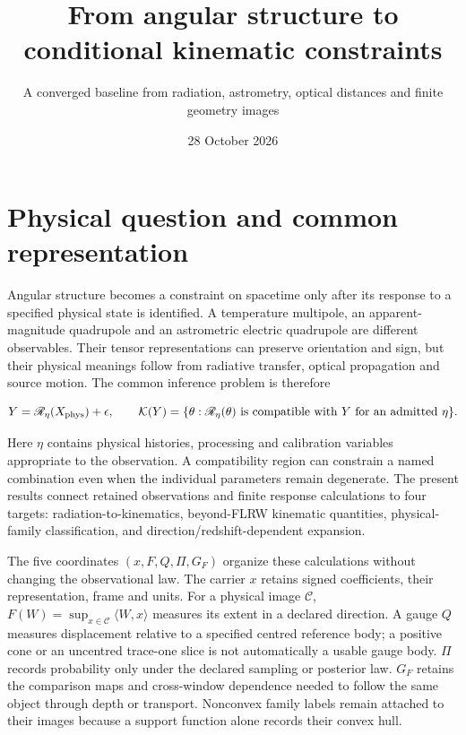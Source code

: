 \documentclass[
  10pt,
]{article}
\title{From angular structure to conditional kinematic constraints}
\subtitle{A converged baseline from radiation, astrometry, optical
distances and finite geometry images}
\author{}
\date{28 October 2026}
\begin{document}
\maketitle

\hypertarget{physical-question-and-common-representation}{%
\section{Physical question and common
representation}\label{physical-question-and-common-representation}}

Angular structure becomes a constraint on spacetime only after its
response to a specified physical state is identified. A temperature
multipole, an apparent-magnitude quadrupole and an astrometric electric
quadrupole are different observables. Their tensor representations can
preserve orientation and sign, but their physical meanings follow from
radiative transfer, optical propagation and source motion. The common
inference problem is therefore

\[
Y=\mathscr R_\eta(X_{\rm phys})+\epsilon,
\qquad
\mathcal K(Y)=\{\theta:\mathscr R_\eta(\theta)\text{ is compatible with }Y
\text{ for an admitted }\eta\}.
\]

Here \(\eta\) contains physical histories, processing and calibration
variables appropriate to the observation. A compatibility region can
constrain a named combination even when the individual parameters remain
degenerate. The present results connect retained observations and finite
response calculations to four targets: radiation-to-kinematics,
beyond-FLRW kinematic quantities, physical-family classification, and
direction/redshift-dependent expansion.

The five coordinates \((x,F,Q,\Pi,G_F)\) organize these calculations
without changing the observational law. The carrier \(x\) retains signed
coefficients, their representation, frame and units. For a physical
image \(\mathcal C\), \(F(W)=\sup_{x\in\mathcal C}\langle W,x\rangle\)
measures its extent in a declared direction. A gauge \(Q\) measures
displacement relative to a specified centred reference body; a positive
cone or an uncentred trace-one slice is not automatically a usable gauge
body. \(\Pi\) records probability only under the declared sampling or
posterior law. \(G_F\) retains the comparison maps and cross-window
dependence needed to follow the same object through depth or transport.
Nonconvex family labels remain attached to their images because a
support function alone records their convex hull.
\end{document}
